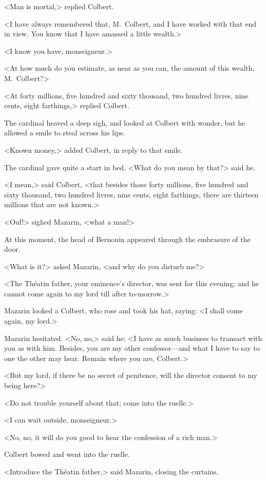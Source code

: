 <Man is mortal,> replied Colbert.

<I have always remembered that, M.~Colbert, and I have worked with that end in view. You know that I have amassed a little wealth.>

<I know you have, monseigneur.>

<At how much do you estimate, as near as you can, the amount of this wealth, M.~Colbert?>

<At forty millions, five hundred and sixty thousand, two hundred livres, nine cents, eight farthings,> replied Colbert.

The cardinal heaved a deep sigh, and looked at Colbert with wonder, but he allowed a smile to steal across his lips.

<Known money,> added Colbert, in reply to that smile.

The cardinal gave quite a start in bed. <What do you mean by that?> said he.

<I mean,> said Colbert, <that besides those forty millions, five hundred and sixty thousand, two hundred livres, nine cents, eight farthings, there are thirteen millions that are not known.>

<Ouf!> sighed Mazarin, <what a man!>

At this moment, the head of Bernouin appeared through the embrasure of the door.

<What is it?> asked Mazarin, <and why do you disturb me?>

<The Théatin father, your eminence's director, was sent for this evening; and he cannot come again to my lord till after to-morrow.>

Mazarin looked a Colbert, who rose and took his hat, saying: <I shall come again, my lord.>

Mazarin hesitated. <No, no,> said he; <I have as much business to transact with you as with him. Besides, you are my other confessor—and what I have to say to one the other may hear. Remain where you are, Colbert.>

<But my lord, if there be no secret of penitence, will the director consent to my being here?>

<Do not trouble yourself about that; come into the ruelle.>

<I can wait outside, monseigneur.>

<No, no, it will do you good to hear the confession of a rich man.>

Colbert bowed and went into the ruelle.

<Introduce the Théatin father,> said Mazarin, closing the curtains. 